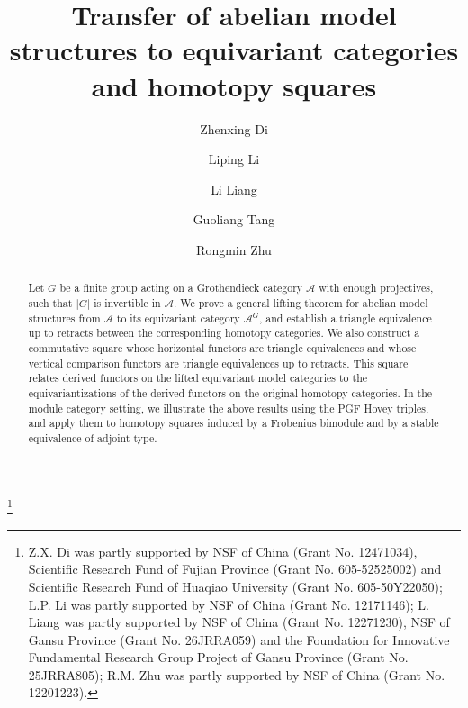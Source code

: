 \documentclass[12pt,twoside]{amsart}
\theoremstyle{bfupright head,slanted body}
\theoremstyle{bfupright head,upright body}
\theoremstyle{fixed bf head,slanted body}
\theoremstyle{fixed bf head,upright body}
\theoremstyle{numbered paragraph}
\numberwithin{equation}{res}
\newcommand{\calA}{\mathcal{A}}
\begin{document}
\title[Transfer of abelian model structures to equivariant categories]%
{Transfer of abelian model structures to equivariant categories and homotopy squares}

\author[Z.X. Di]{Zhenxing Di}
\address{Zhenxing Di: School of Mathematical Sciences,
Huaqiao University, Quanzhou 362021, China}

\author[L.P. Li]{Liping Li}
\address{Liping Li: Department of Mathematics, Hunan Normal University, Changsha 410081, China}

\author[L. Liang]{Li Liang}
\address{Li Liang: Department of Mathematics, Gansu Center for Fundamental Research in Complex Systems Analysis and Control, Lanzhou Jiaotong University, Lanzhou 730070, China}

\author[G.L. Tang]{Guoliang Tang}
\address{Guoliang Tang: School of Mathematical Sciences,
Zhejiang Normal University, Jinhua 321004, China}

\author[R.M. Zhu]{Rongmin Zhu}
\address{Rongmin Zhu (Corresponding Author): School of Mathematical Sciences,
Huaqiao University, Quanzhou 362021, China}

\thanks{Z.X. Di was partly supported by NSF of China (Grant No. 12471034),
Scientific Research Fund of Fujian Province (Grant No. 605-52525002) and
Scientific Research Fund of Huaqiao University (Grant No. 605-50Y22050); L.P. Li was partly supported by NSF of China (Grant No. 12171146); L. Liang was partly supported by NSF of China (Grant No. 12271230), NSF of Gansu Province (Grant No. 26JRRA059) and the Foundation for Innovative Fundamental Research Group Project of Gansu Province (Grant No. 25JRRA805); R.M. Zhu was partly supported by NSF of China (Grant No. 12201223).}



\renewcommand{\thefootnote}{\alph{footnote}}

\begin{abstract}
Let \(G\) be a finite group acting on a Grothendieck category \(\calA\) with enough projectives, such that \(|G|\) is invertible in \(\calA\).
We prove a general lifting theorem for abelian model structures from \(\calA\) to its equivariant category \(\calA^G\), and establish a triangle equivalence up to retracts between the corresponding homotopy categories.
We also construct a commutative square whose horizontal functors are triangle equivalences and whose vertical comparison functors are triangle equivalences up to retracts.
This square relates derived functors on the lifted equivariant model categories to the equivariantizations of the derived functors on the original homotopy categories.
In the module category setting, we illustrate the above results using the PGF Hovey triples, and apply them to homotopy squares induced by a Frobenius bimodule and by a stable equivalence of adjoint type.
\end{abstract}
\end{document}
